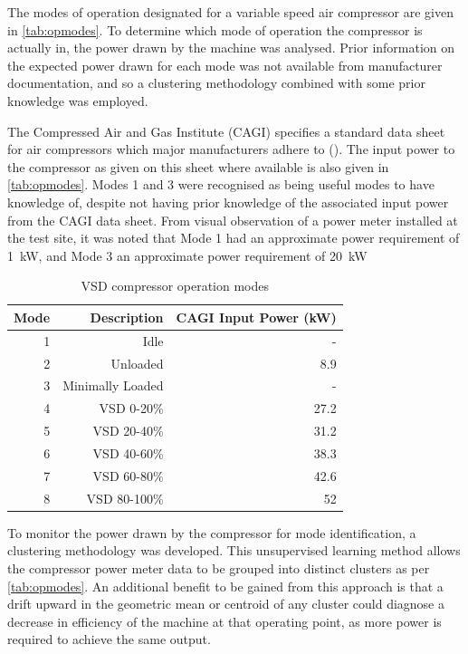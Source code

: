 The modes of operation designated for a variable speed air compressor are given in \autoref{tab:opmodes}. To determine which mode of operation the compressor is actually in, the power drawn by the machine was analysed. Prior information on the expected power drawn for each mode was not available from manufacturer documentation, and so a clustering methodology combined with some prior knowledge was employed.

The Compressed Air and Gas Institute (CAGI) specifies a standard data sheet for air compressors which major manufacturers adhere to (\cite{CAGI}). The input power to the compressor as given on this sheet where available is also given in \autoref{tab:opmodes}. Modes 1 and 3 were recognised as being useful modes to have knowledge of, despite not having prior knowledge of the associated input power from the CAGI data sheet. From visual observation of a power meter installed at the test site, it was noted that Mode 1 had an approximate power requirement of \SI{1}{\kilo \watt}, and Mode 3 an approximate power requirement of \SI{20}{\kilo \watt}

\begin{table}[htbp]
  \centering
  \caption{VSD compressor operation modes}
    \begin{tabular}{rrr}
    \toprule
    Mode  & Description & CAGI Input Power (kW)\\
    \midrule
    1     & Idle & -\\
    2     & Unloaded & 8.9 \\
    3     & Minimally Loaded & - \\
    4     & VSD 0-20\% & 27.2 \\
    5     & VSD 20-40\% & 31.2 \\
    6     & VSD 40-60\% & 38.3\\
    7     & VSD 60-80\% & 42.6 \\
    8     & VSD 80-100\% & 52\\
    \bottomrule
    \end{tabular}%
  \label{tab:opmodes}%
\end{table}%

To monitor the power drawn by the compressor for mode identification, a clustering methodology was developed. This unsupervised learning method allows the compressor power meter data to be grouped into distinct clusters as per \autoref{tab:opmodes}. An additional benefit to be gained from this approach is that a drift upward in the geometric mean or centroid of any cluster could diagnose a decrease in efficiency of the machine at that operating point, as more power is required to achieve the same output.

